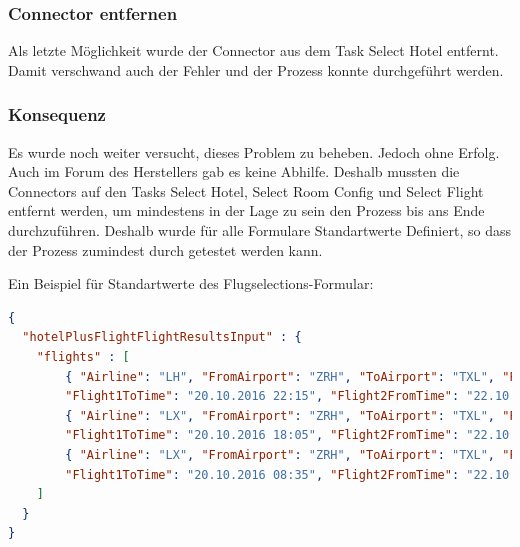 \subsubsection{Connector entfernen}
\label{sec:umsetzung:problem:removeconnector}
Als letzte Möglichkeit wurde der Connector aus dem Task Select Hotel entfernt. Damit verschwand auch der Fehler und der Prozess konnte durchgeführt werden.

\subsubsection{Konsequenz}
Es wurde noch weiter versucht, dieses Problem zu beheben. Jedoch ohne Erfolg. Auch im Forum des Herstellers gab es keine Abhilfe. Deshalb mussten die Connectors auf den Tasks Select Hotel, Select Room Config und Select Flight entfernt werden, um mindestens in der Lage zu sein den Prozess bis ans Ende durchzuführen. Deshalb wurde für alle Formulare Standartwerte Definiert, so dass der Prozess zumindest durch getestet werden kann.

Ein Beispiel für Standartwerte des Flugselections-Formular:
\begin{lstlisting}[language=json,firstnumber=1]
{
  "hotelPlusFlightFlightResultsInput" : {
    "flights" : [
        { "Airline": "LH", "FromAirport": "ZRH", "ToAirport": "TXL", "Flight1FromTime": "20.10.2016 20:15", 
        "Flight1ToTime": "20.10.2016 22:15", "Flight2FromTime": "22.10.2016 12:25", "Flight2ToTime": "22.10.2016 14:35"},
        { "Airline": "LX", "FromAirport": "ZRH", "ToAirport": "TXL", "Flight1FromTime": "20.10.2016 16:00", 
        "Flight1ToTime": "20.10.2016 18:05", "Flight2FromTime": "22.10.2016 20:45", "Flight2ToTime": "22.10.2016 22:40"},
        { "Airline": "LX", "FromAirport": "ZRH", "ToAirport": "TXL", "Flight1FromTime": "20.10.2016 06:30", 
        "Flight1ToTime": "20.10.2016 08:35", "Flight2FromTime": "22.10.2016 16:00", "Flight2ToTime": "22.10.2016 18:00"}
    ]
  }
}
\end{lstlisting}
